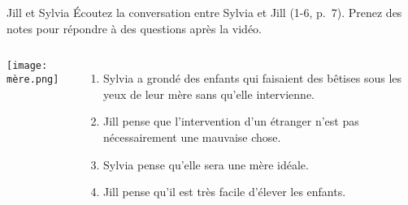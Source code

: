 \begin{frame}{Jill et Sylvia}
  Écoutez la conversation entre Sylvia et Jill (1-6, p.~7).
  Prenez des notes pour répondre à des questions après la vidéo.
  \begin{columns}
      \begin{center}
        \texttt{[image: mère.png]}
      \end{center}
      \begin{enumerate}
        \item Sylvia a grondé des enfants qui faisaient des bêtises sous les yeux de leur mère sans qu'elle intervienne.
        \item Jill pense que l'intervention d'un étranger n'est pas nécessairement une mauvaise chose. 
        \item Sylvia pense qu'elle sera une mère idéale.
        \item Jill pense qu'il est très facile d'élever les enfants.
      \end{enumerate}
  \end{columns}
\end{frame}